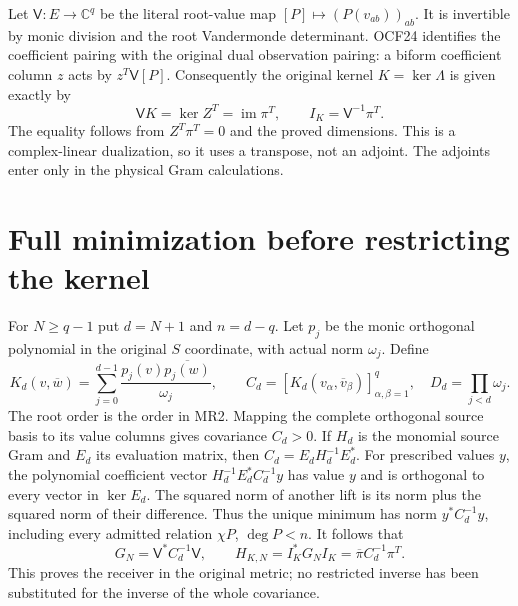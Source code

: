 \documentclass[11pt]{article}
\newcommand{\C}{\mathbb C}
\begin{document}
Let $\mathsf V:E\to\C^q$ be the literal root-value map
$[P]\mapsto(P(v_{ab}))_{ab}$. It is invertible by monic division
and the root Vandermonde determinant. OCF24 identifies the coefficient
pairing with the original dual observation pairing: a biform coefficient
column $z$ acts by $z^T\mathsf V[P]$. Consequently the original kernel
$K=\ker\Lambda$ is given exactly by
\[
 \mathsf V K=\ker Z^T=\operatorname{im}\pi^T,
 \qquad I_K=\mathsf V^{-1}\pi^T.\tag{MR8}
\]
The equality follows from $Z^T\pi^T=0$ and the proved dimensions.
This is a complex-linear dualization, so it uses a transpose, not an
adjoint. The adjoints enter only in the physical Gram calculations.

\section{Full minimization before restricting the kernel}
For $N\ge q-1$ put $d=N+1$ and $n=d-q$. Let $p_j$ be the monic
orthogonal polynomial in the original $S$ coordinate, with actual norm
$\omega_j$. Define
\[
 K_d(v,\overline w)=\sum_{j=0}^{d-1}
       \frac{p_j(v)\overline{p_j(w)}}{\omega_j},
 \qquad C_d=[K_d(v_\alpha,\overline v_\beta)]_{\alpha,\beta=1}^q,
 \quad D_d=\prod_{j<d}\omega_j.\tag{MR9}
\]
The root order is the order in MR2. Mapping the complete orthogonal
source basis to its value columns gives covariance $C_d>0$.
If $H_d$ is the monomial source Gram and $E_d$ its evaluation matrix,
then $C_d=E_dH_d^{-1}E_d^*$. For prescribed values $y$, the polynomial
coefficient vector $H_d^{-1}E_d^*C_d^{-1}y$ has value $y$ and is
orthogonal to every vector in $\ker E_d$. The squared norm of another
lift is its norm plus the squared norm of their difference. Thus the
unique minimum has norm $y^*C_d^{-1}y$, including every admitted
relation $\chi P$, $\deg P<n$. It follows that
\[
 G_N=\mathsf V^*C_d^{-1}\mathsf V,
 \qquad H_{K,N}=I_K^*G_NI_K
           =\overline\pi C_d^{-1}\pi^T.\tag{MR10}
\]
This proves the receiver in the original metric; no restricted inverse
has been substituted for the inverse of the whole covariance.
\end{document}
